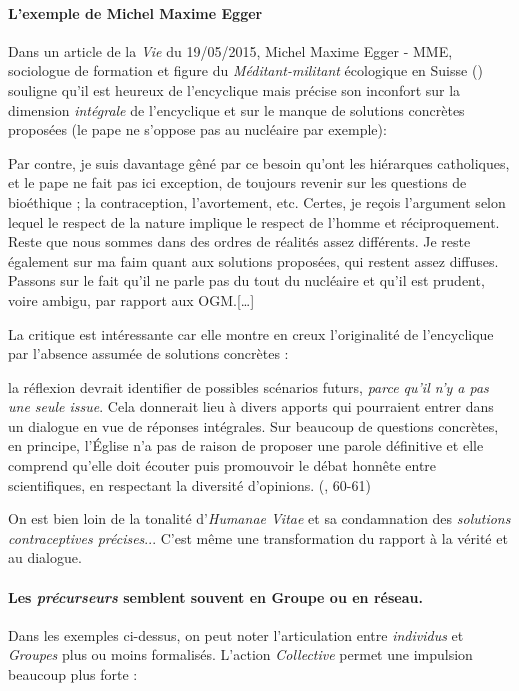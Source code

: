 \paragraph{L'exemple de Michel Maxime Egger } Dans un article de la \textit{Vie} du 19/05/2015, Michel Maxime Egger - MME, sociologue de formation et figure du \textit{Méditant-militant} écologique en Suisse (\cite{alexandre_grandjean_christophe_monnot_irene_becci_spiritualites_2018}) souligne qu'il est heureux de l'encyclique mais précise son inconfort sur la dimension \textit{intégrale} de l'encyclique et sur le manque de solutions concrètes proposées (le pape ne s'oppose pas au nucléaire par exemple): 
\begin{singlequote}
 [\ldots]
Par contre, je suis davantage gêné par ce besoin qu'ont les hiérarques catholiques, et le pape ne fait pas ici exception, de toujours revenir sur les questions de bioéthique ; la contraception, l'avortement, etc. Certes, je reçois l'argument selon lequel le respect de la nature implique le respect de l'homme et réciproquement. Reste que nous sommes dans des ordres de réalités assez différents. Je reste également sur ma faim quant aux solutions proposées, qui restent assez diffuses. Passons sur le fait qu'il ne parle pas du tout du nucléaire et qu'il est prudent, voire ambigu, par rapport aux OGM.[\ldots]
\end{singlequote}

La critique est intéressante car elle montre en creux l'originalité de l'encyclique par l'absence assumée de solutions concrètes : 
\begin{singlequote}
    [\ldots] la réflexion devrait identifier de possibles scénarios futurs, \textit{parce qu’il n’y a pas une seule issue}. Cela donnerait lieu à divers apports qui pourraient entrer dans un dialogue en vue de réponses intégrales. Sur beaucoup de questions concrètes, en principe, l’Église n’a pas de raison de proposer une parole définitive et elle comprend qu’elle doit écouter puis promouvoir le débat honnête entre scientifiques, en respectant la diversité d’opinions.  (\LS, 60-61)
\end{singlequote}
On est bien loin de la tonalité d'\textit{Humanae Vitae} et sa condamnation des \textit{solutions contraceptives précises}... C'est même une transformation du rapport à la vérité et au dialogue. 


\paragraph{Les \textit{précurseurs} semblent souvent en Groupe ou en réseau.}  Dans les exemples ci-dessus, on peut noter l'articulation entre \textit{individus} et \textit{Groupes} plus ou moins formalisés. L'action \textit{Collective} permet une impulsion beaucoup plus forte : 

